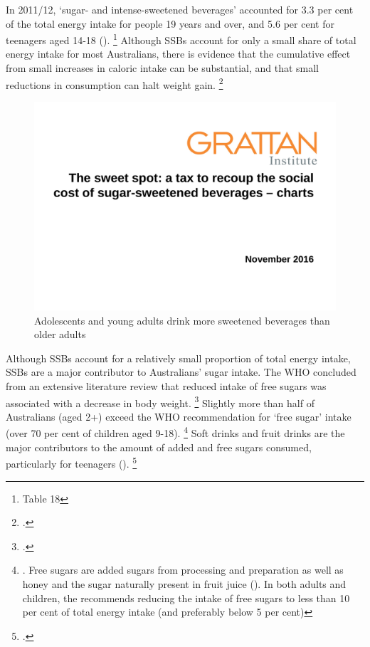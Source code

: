 \documentclass[embargoed]{grattan}
\begin{document}
In 2011/12, `sugar- and intense-sweetened beverages' accounted for 3.3 per cent of the total energy intake for people 19 years and over, and 5.6 per cent for teenagers aged 14-18 ().%
\footnote{\textcite{ABS20144364055007AustralianHealth} Table 18} Although SSBs account for only a small share of total energy intake for most Australians, there is evidence that the cumulative effect from small increases in caloric intake can be substantial, and that small reductions in consumption can halt weight gain.%
\footcites{Fletcher2011Aresoftdrink}{Cutler2003WhyhaveAmericans}

\begin{figure}
\caption{Adolescents and young adults drink more sweetened beverages than older adults}\label{fig:adolescents-drink-more-sweet-beverages-than-adults}

\includegraphics[page=9]{atlas/ObesityCharts}


\end{figure}


Although SSBs account for a relatively small proportion of total energy intake, SSBs are a major contributor to Australians' sugar intake.
The WHO concluded from an extensive literature review that reduced intake of free sugars was associated with a decrease in body weight.%
\footcite{Organisation2015Sugarsintakeadults} Slightly more than half of Australians (aged 2+) exceed the WHO recommendation for `free sugar' intake (over 70 per cent of children aged 9-18).%
\footnote{\textcite{Lei2016Dietaryintakefood}.
Free sugars are added sugars from processing and preparation as well as honey and the sugar naturally present in fruit juice (\textcite[][Table~3.1]{ABS20164364055011AustralianHealth}).
In both adults and children, the \textcite{Organisation2015Sugarsintakeadults} recommends reducing the intake of free sugars to less than 10 per cent of total energy intake (and preferably below 5 per cent)} Soft drinks and fruit drinks are the major contributors to the amount of added and free sugars consumed, particularly for teenagers ().%
\footcite{ABS20164364055011AustralianHealth}
\end{document}
